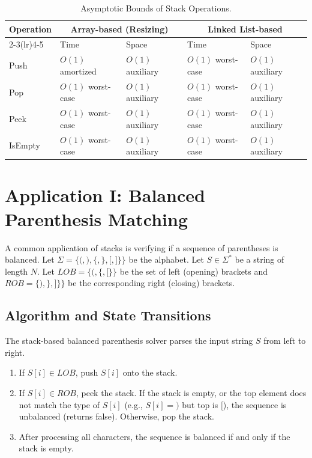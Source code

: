 \documentclass[10pt,journal,compsoc,onecolumn]{IEEEtran}
\begin{document}
\begin{table}[htbp]
\centering
\caption{Asymptotic Bounds of Stack Operations.}
\label{tab:complexities}
\begin{tabular}{lllll}
\toprule
Operation & \multicolumn{2}{c}{Array-based (Resizing)} & \multicolumn{2}{c}{Linked List-based} \\
\cmidrule(lr){2-3}\cmidrule(lr){4-5}
& Time & Space & Time & Space \\
\midrule
Push & $O(1)$ amortized & $O(1)$ auxiliary & $O(1)$ worst-case & $O(1)$ auxiliary \\
Pop & $O(1)$ worst-case & $O(1)$ auxiliary & $O(1)$ worst-case & $O(1)$ auxiliary \\
Peek & $O(1)$ worst-case & $O(1)$ auxiliary & $O(1)$ worst-case & $O(1)$ auxiliary \\
IsEmpty & $O(1)$ worst-case & $O(1)$ auxiliary & $O(1)$ worst-case & $O(1)$ auxiliary \\
\bottomrule
\end{tabular}
\end{table}

\section{Application I: Balanced Parenthesis Matching}
A common application of stacks is verifying if a sequence of parentheses is balanced. Let $\Sigma = \{\text{(}, \text{)}, \text{\{}, \text{\}}, \text{[}, \text{]}\}\}$ be the alphabet. Let $S \in \Sigma^*$ be a string of length $N$. Let $LOB = \{\text{(}, \text{\{}, \text{[}\}\}$ be the set of left (opening) brackets and $ROB = \{\text{)}, \text{\}}, \text{]}\}\}$ be the corresponding right (closing) brackets.

\subsection{Algorithm and State Transitions}
The stack-based balanced parenthesis solver parses the input string $S$ from left to right.
\begin{enumerate}
    \item If $S[i] \in LOB$, push $S[i]$ onto the stack.
    \item If $S[i] \in ROB$, peek the stack. If the stack is empty, or the top element does not match the type of $S[i]$ (e.g., $S[i] = \text{)}$ but top is $\text{[}$), the sequence is unbalanced (returns false). Otherwise, pop the stack.
    \item After processing all characters, the sequence is balanced if and only if the stack is empty.
\end{enumerate}
\end{document}
